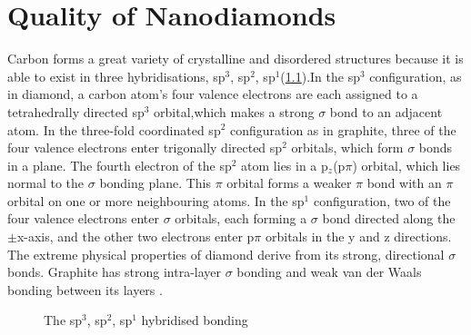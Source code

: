 
\chapter{Quality of Nanodiamonds}	\label{ch::crystal_quality}

		Carbon forms a great variety of crystalline and disordered structures because it is able to exist in three hybridisations, sp$^3$, sp$^2$, sp$^1$(\cref{fig::c_bonds})\cite{Robertson1986}.In the sp$^3$ configuration, as in diamond, a carbon atom's four valence electrons are each assigned to a tetrahedrally directed sp$^3$ orbital,which makes a strong $\sigma$ bond to an adjacent atom. In the three-fold coordinated sp$^2$ configuration as in graphite, three of the four valence electrons enter trigonally directed sp$^2$ orbitals, which form $\sigma$ bonds in a plane. The fourth electron of the sp$^2$ atom lies in a p$_z$(p$\pi$) orbital, which lies normal to the $\sigma$ bonding plane. This $\pi$  orbital forms a weaker $\pi$ bond with an $\pi$ orbital on one or more neighbouring atoms. In the sp$^1$ configuration, two of the four valence electrons enter $\sigma$ orbitals, each forming a $\sigma$ bond directed along the $\pm$x-axis, and the other two electrons enter p$\pi$ orbitals in the y and z directions. The extreme physical properties of diamond derive from its strong, directional $\sigma$ bonds. Graphite has strong intra-layer $\sigma$ bonding and weak van der Waals bonding between its layers \cite{Robertson2002}.

		\begin{figure}[htb]
			\centering
			\caption{The sp$^3$, sp$^2$, sp$^1$ hybridised bonding \cite{Robertson1986}}
			\label{fig::c_bonds}
		\end{figure}

